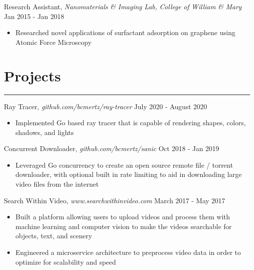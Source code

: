\documentclass[12pt]{article}
\begin{document}
\noindent Research Assistant, \textit{Nanomaterials \& Imaging Lab, College of William \& Mary} \hfill Jan 2015 - Jan 2018
\vspace{-0.2cm}
\begin{itemize}
  \itemsep-0.4em
	\item Researched novel applications of surfactant adsorption on graphene using Atomic Force Microscopy
\end{itemize}

\vspace{-0.50cm}
\section*{Projects}
\vspace{-0.2cm}
\hrule
\vspace{0.25cm}

\noindent Ray Tracer, \textit{github.com/bcmertz/ray-tracer} \hfill July 2020 - August 2020
\vspace{-0.2cm}
\begin{itemize}
  \itemsep-0.4em
        \item Implemented Go based ray tracer that is capable of rendering shapes, colors, shadows, and lights
\end{itemize}

\noindent Concurrent Downloader, \textit{github.com/bcmertz/sanic} \hfill Oct 2018 - Jan 2019
\vspace{-0.2cm}
\begin{itemize}
  \itemsep-0.4em
        \item Leveraged Go concurrency to create an open source remote file / torrent downloader, with optional built in rate limiting to aid in downloading large video files from the internet
\end{itemize}


\noindent Search Within Video, \textit{www.searchwithinvideo.com} \hfill March 2017 - May 2017
\vspace{-0.2cm}
\begin{itemize}
  \itemsep-0.4em
        \item Built a platform allowing users to upload videos and process them with machine learning and computer vision to make the videos searchable for objects, text, and scenery
	\item Engineered a microservice architecture to preprocess video data in order to optimize for scalability and speed
\end{itemize}
\end{document}

